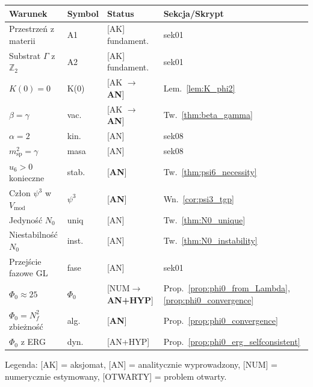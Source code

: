 \begin{center}
\begin{tabular}{llll}
\toprule
Warunek & Symbol & Status & Sekcja/Skrypt \\
\midrule
Przestrzeń z materii & A1 & [AK] fundament. & sek01 \\
Substrat $\Gamma$ z $\mathbb{Z}_2$ & A2 & [AK] fundament. & sek01 \\
$K(0) = 0$ & K(0) & [AK $\to$ \textbf{AN}] & Lem.~\ref{lem:K_phi2} \\
$\beta = \gamma$ & vac. & [AK $\to$ \textbf{AN}] & Tw.~\ref{thm:beta_gamma} \\
$\alpha = 2$ & kin. & [AN] & sek08 \\
$m_\mathrm{sp}^2 = \gamma$ & masa & [AN] & sek08 \\
$u_6 > 0$ konieczne & stab. & [\textbf{AN}] & Tw.~\ref{thm:psi6_necessity} \\
Człon $\psi^3$ w $V_\mathrm{mod}$ & $\psi^3$ & [\textbf{AN}] & Wn.~\ref{cor:psi3_tgp} \\
Jedyność $N_0$ & uniq & [AN] & Tw.~\ref{thm:N0_unique} \\
Niestabilność $N_0$ & inst. & [AN] & Tw.~\ref{thm:N0_instability} \\
Przejście fazowe GL & fase & [AN] & sek01 \\
$\Phi_0 \approx 25$ & $\Phi_0$ & [NUM$\to$\textbf{AN+HYP}] & Prop.~\ref{prop:phi0_from_Lambda}, \ref{prop:phi0_convergence} \\
$\Phi_0 = N_f^2$ zbieżność & alg. & [\textbf{AN}] & Prop.~\ref{prop:phi0_convergence} \\
$\Phi_0$ z ERG & dyn. & [AN+HYP] & Prop.~\ref{prop:phi0_erg_selfconsistent} \\
\bottomrule
\end{tabular}
\end{center}

\noindent Legenda: [AK] = aksjomat, [AN] = analitycznie wyprowadzony,
[NUM] = numerycznie estymowany, [OTWARTY] = problem otwarty.
